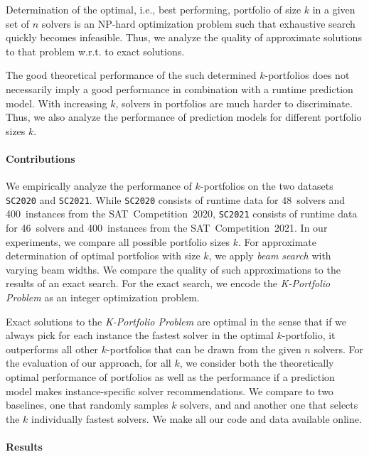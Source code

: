 \documentclass[conference]{IEEEtran}
\begin{document}
Determination of the optimal, i.e., best performing, portfolio of size $k$ in a given set of $n$ solvers is an NP-hard optimization problem such that exhaustive search quickly becomes infeasible.
Thus, we analyze the quality of approximate solutions to that problem w.r.t. to exact solutions. 

The good theoretical performance of the such determined $k$-portfolios does not necessarily imply a good performance in combination with a runtime prediction model. 
With increasing $k$, solvers in portfolios are much harder to discriminate.
Thus, we also analyze the performance of prediction models for different portfolio sizes $k$.

\paragraph{Contributions}

We empirically analyze the performance of $k$-portfolios on the two datasets \texttt{SC2020} and \texttt{SC2021}. 
While \texttt{SC2020} consists of runtime data for 48~solvers and 400~instances from the SAT~Competition~2020, \texttt{SC2021} consists of runtime data for 46~solvers and 400~instances from the SAT~Competition~2021. 
In our experiments, we compare all possible portfolio sizes $k$.
For approximate determination of optimal portfolios with size $k$, we apply \emph{beam search} with varying beam widths.
We compare the quality of such approximations to the results of an exact search.
For the exact search, we encode the \emph{K-Portfolio Problem} as an integer optimization problem. 

Exact solutions to the \emph{K-Portfolio Problem} are optimal in the sense that if we always pick for each instance the fastest solver in the optimal $k$-portfolio, it outperforms all other $k$-portfolios that can be drawn from the given $n$ solvers.
For the evaluation of our approach, for all $k$, we consider both the theoretically optimal performance of portfolios as well as the performance if a prediction model makes instance-specific solver recommendations.
We compare to two baselines, one that randomly samples $k$ solvers, and and another one that selects the $k$ individually fastest solvers.
We make all our code and data available online.

\paragraph{Results}
\end{document}
